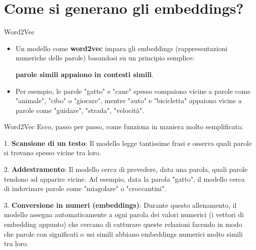 \documentclass[aspectratio=169]{beamer}
\begin{document}
\section{Come si generano gli embeddings?}
%
%
\begin{frame}{Word2Vec}
\begin{itemize}
\item Un modello come \textbf{word2vec} impara gli embeddings (rappresentazioni numeriche delle parole) basandosi su un principio semplice:\\ 
\begin{center}
\textbf{parole simili appaiono in contesti simili}.
\end{center}
\vspace{.5cm}
\item Per esempio, le parole "gatto" e "cane" spesso compaiono vicine a parole come "animale", "cibo" o "giocare", mentre "auto" e "bicicletta" appaiono vicine a parole come "guidare", "strada", "velocità".
\end{itemize}
\end{frame}
%
%
\begin{frame}{Word2Vec}
Ecco, passo per passo, come funziona in maniera molto semplificata:

1. \textbf{Scansione di un testo}:  
   Il modello legge tantissime frasi e osserva quali parole si trovano spesso vicine tra loro.

2. \textbf{Addestramento}:  
   Il modello cerca di prevedere, data una parola, quali parole tendono ad apparire vicine. Ad esempio, data la parola "gatto", il modello cerca di indovinare parole come "miagolare" o "croccantini".

3. \textbf{Conversione in numeri (embeddings)}:  
   Durante questo allenamento, il modello assegna automaticamente a ogni parola dei valori numerici (i vettori di embedding appunto) che cercano di catturare queste relazioni facendo in modo che parole con significati o usi simili abbiano embeddings numerici molto simili tra loro.
\end{frame}
%
%
\end{document}
